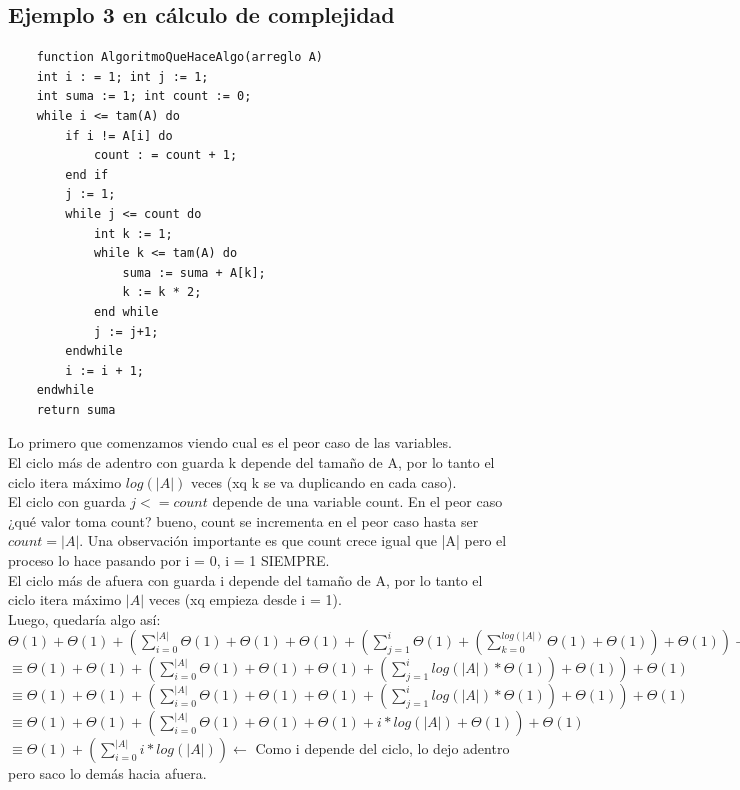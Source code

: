 \documentclass[10pt,a4paper]{article}
\begin{document}
\subsection*{Ejemplo 3 en cálculo de complejidad}
\begin{lstlisting}
    function AlgoritmoQueHaceAlgo(arreglo A)
    int i : = 1; int j := 1;
    int suma := 1; int count := 0;
    while i <= tam(A) do 
        if i != A[i] do 
            count : = count + 1;
        end if 
        j := 1;
        while j <= count do 
            int k := 1;
            while k <= tam(A) do 
                suma := suma + A[k];
                k := k * 2;
            end while 
            j := j+1;
        endwhile 
        i := i + 1;
    endwhile
    return suma
\end{lstlisting}
Lo primero que comenzamos viendo cual es el peor caso de las variables. \\
El ciclo más de adentro con guarda k depende del tamaño de A, por lo tanto el ciclo itera máximo $log(|A|)$ veces (xq k se va duplicando en cada caso). \\
El ciclo con guarda $j <= count$ depende de una variable count. En el peor caso ¿qué valor toma count? bueno, count se incrementa en el peor caso hasta ser $count = |A|$. Una observación importante es que count crece igual que |A| pero el proceso lo hace pasando por i = 0, i = 1 SIEMPRE. \\
El ciclo más de afuera con guarda i depende del tamaño de A, por lo tanto el ciclo itera máximo $|A|$ veces (xq empieza desde i = 1). \\
Luego, quedaría algo así: \\
$ \Theta(1) + \Theta(1) + (\sum_{i=0}^{|A|}{\Theta(1) + \Theta(1) + \Theta(1) + (\sum_{j=1}^{i}{\Theta(1) + (\sum_{k=0}^{log(|A|)}{\Theta(1) + \Theta(1)}) + \Theta(1)})} + \Theta(1)) + \Theta(1)  $ \\
$ \equiv \Theta(1) + \Theta(1) + (\sum_{i=0}^{|A|}{\Theta(1) + \Theta(1) + \Theta(1) + (\sum_{j=1}^{i}{log(|A|) \ast \Theta(1)})} + \Theta(1)) + \Theta(1) $ \\ 
$ \equiv \Theta(1) + \Theta(1) + (\sum_{i=0}^{|A|}{\Theta(1) + \Theta(1) + \Theta(1) + (\sum_{j=1}^{i}{log(|A|) \ast \Theta(1)})} + \Theta(1)) + \Theta(1) $ \\ 
$ \equiv \Theta(1) + \Theta(1) + (\sum_{i=0}^{|A|}{\Theta(1) + \Theta(1) + \Theta(1) + i * log(|A|)} + \Theta(1)) + \Theta(1) $ \\ 
$ \equiv \Theta(1) + (\sum_{i=0}^{|A|}{i * log(|A|)}) \leftarrow $ Como i depende del ciclo, lo dejo adentro pero saco lo demás hacia afuera.  \\ 
\end{document}
